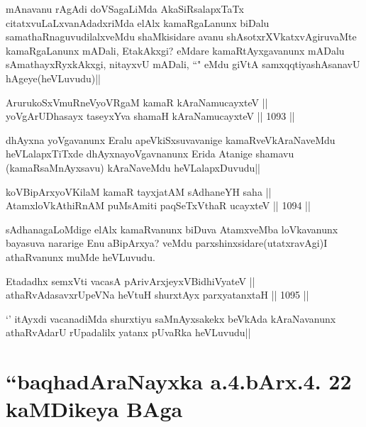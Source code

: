 \begin{artha}
mAnavanu rAgAdi doVSagaLiMda AkaSiRsalapxTaTx citatxvuLaLxvanAdadxriMda elAlx kamaRgaLanunx biDalu samathaRnaguvudilalxveMdu shaMkisidare avanu shAsotxrXVkatxvAgiruvaMte kamaRgaLanunx mADali, EtakAkxgi? eMdare kamaRtAyxgavanunx mADalu sAmathayxRyxkAkxgi, nitayxvU mADali, ``\stext" eMdu giVtA samxqqtiyashAsanavU hAgeye(heVLuvudu)||
\end{artha}

\begin{shl}
ArurukoSxVmuRneVyoVRgaM kamaR kAraNamucayxteV || \\
yoVgArUDhasayx taseyxYva shamaH kAraNamucayxteV ||  1093 ||  
\end{shl}

\begin{artha}
dhAyxna yoVgavanunx Eralu apeVkiSxsuvavanige kamaRveVkAraNaveMdu heVLalapxTiTxde dhAyxnayoVgavnanunx Erida Atanige shamavu (kamaRsaMnAyxsavu) kAraNaveMdu heVLalapxDuvudu||
\end{artha}


\begin{shl}
koV\s BipArxyoV\s KilaM kamaR tayxjatAM sAdhaneYH saha || \\
AtamxloVkAthiRnAM puMsAmiti paqSeTxV\s thaR ucayxteV ||  1094 ||  
\end{shl}

\begin{artha}
sAdhanagaLoMdige elAlx kamaRvanunx biDuva AtamxveMba loVkavanunx bayasuva nararige Enu aBipArxya? veMdu parxshinxsidare(utatxravAgi)I athaRvanunx muMde heVLuvudu.
\end{artha}

\begin{shl}
Etadadhx semxVti vacasA pArivArxjeyxV\s BidhiVyateV || \\
athaRvAdasavxrUpeVNa heVtuH shurxtAyx parxyatanxtaH ||  1095 ||  
\end{shl}

\begin{artha}
`\stext' itAyxdi vacanadiMda shurxtiyu saMnAyxsakekx beVkAda kAraNavanunx athaRvAdarU rUpadalilx yatanx pUvaRka heVLuvudu||
\end{artha}

\section*{``baqhadAraNayxka a.4.bArx.4. 22 kaMDikeya BAga}

